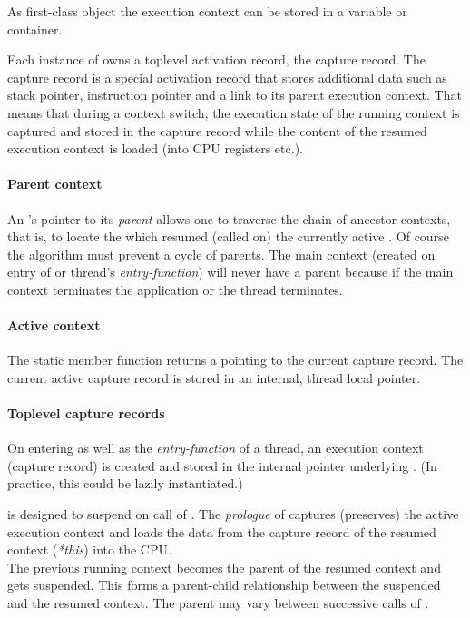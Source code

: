 As first-class object the execution context can be stored in a variable or
container.

Each instance of \ectx owns a toplevel activation record, the capture record.
The capture record is a special activation record that stores additional data
such as stack pointer, instruction pointer and a link to its parent execution
context. That means that during a context switch, the execution state
of the running context is captured and stored in the capture record while the
content of the resumed execution context is loaded (into CPU registers etc.).

\paragraph*{Parent context}
An 's pointer to
its \emph{parent}  allows one to traverse the chain of
ancestor contexts, that is, to locate the  which resumed
(called \ectxop on) the currently active . Of course
the algorithm must prevent a cycle of parents. The main context (created
on entry of \main or thread's \emph{entry-function}) will never have a parent
because if the main context terminates the application or the thread terminates.

\paragraph*{Active context}
The static member function \ectxcurrent returns a \ectx pointing to the
current capture record. The current active capture record is stored in an
internal, thread local pointer.

\paragraph*{Toplevel capture records}
On entering \main as well as the \emph{entry-function} of a thread, an execution
context (capture record) is created and stored in the internal pointer underlying
\ectxcurrent. (In practice, this could be lazily instantiated.)

\ectx is designed to suspend on call of \ectxop. The \emph{prologue} of \ectxop
captures (preserves) the active execution context and loads the data from the
capture record of the resumed context (\emph{*this}) into the CPU.\\
The previous running context becomes the parent of the resumed context and gets
suspended. This forms a parent-child relationship between the suspended and
the resumed context. The parent may vary between successive calls of \ectxop.

